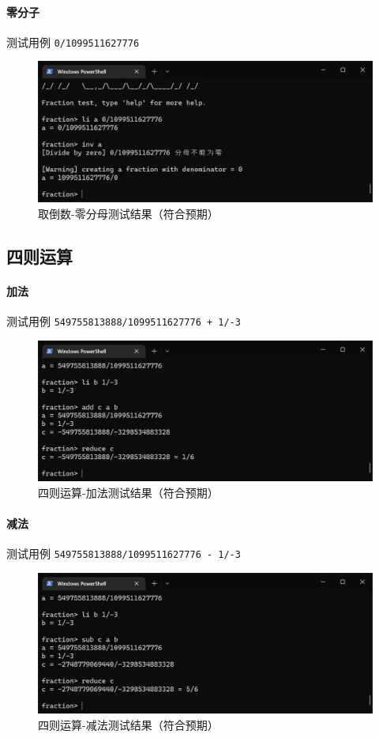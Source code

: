 \documentclass[cn,black,12pt,normal]{elegantnote}
\begin{document}
\paragraph{零分子} 测试用例 \lstinline{0/1099511627776}
\begin{figure}[H]
    \centering
    \includegraphics[width=.8\textwidth]{imgs/test_inv_zero2.jpg}
    \caption{取倒数-零分母测试结果（符合预期）}
\end{figure}

\subsection{四则运算}

\paragraph{加法} 测试用例 \lstinline{549755813888/1099511627776 + 1/-3}
\begin{figure}[H]
    \centering
    \includegraphics[width=.8\textwidth]{imgs/test_op_add.jpg}
    \caption{四则运算-加法测试结果（符合预期）}
\end{figure}

\paragraph{减法} 测试用例 \lstinline{549755813888/1099511627776 - 1/-3}
\begin{figure}[H]
    \centering
    \includegraphics[width=.8\textwidth]{imgs/test_op_sub.jpg}
    \caption{四则运算-减法测试结果（符合预期）}
\end{figure}
\end{document}
